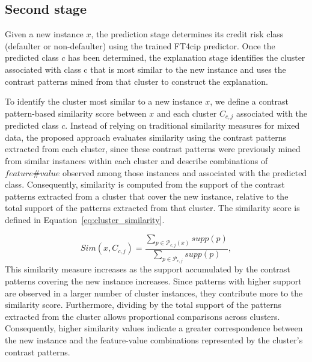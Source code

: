 {\color{blue}			
	\subsection{Second stage}
	Given a new instance $x$, the prediction stage determines its credit risk class (defaulter or non-defaulter) using the trained FT4cip predictor. Once the predicted class $c$ has been determined, the explanation stage identifies the cluster associated with class c that is most similar to the new instance and uses the contrast patterns mined from that cluster to construct the explanation.\newline
	
	To identify the cluster most similar to a new instance $x$, we define a contrast pattern-based similarity score between $x$ and each cluster $C_{c,j}$ associated with the predicted class $c$. Instead of relying on traditional similarity measures for mixed data, the proposed approach evaluates similarity using the contrast patterns extracted from each cluster, since these contrast patterns were previously mined from similar instances within each cluster and describe combinations of $feature\#value$  observed among those instances and associated with the predicted class. Consequently, similarity is computed from the support of the contrast patterns extracted from a cluster that cover the new instance, relative to the total support of the patterns extracted from that cluster. The similarity score is defined in Equation~\ref{eq:cluster_similarity}.\newline
	
	\begin{equation}
		Sim(x, C_{c,j})
		=
		\frac{
			\sum\limits_{p \in \mathcal{P}_{c,j}(x)} supp(p)
		}{
			\sum\limits_{p \in \mathcal{P}_{c,j}} supp(p)
		},
		\label{eq:cluster_similarity}
	\end{equation}
	This similarity measure increases as the support accumulated by the contrast patterns covering the new instance increases. Since patterns with higher support are observed in a larger number of cluster instances, they contribute more to the similarity score. Furthermore, dividing by the total support of the patterns extracted from the cluster allows proportional comparisons across clusters. Consequently, higher similarity values indicate a greater correspondence between the new instance and the feature-value combinations represented by the cluster's contrast patterns.\newline
	
}
